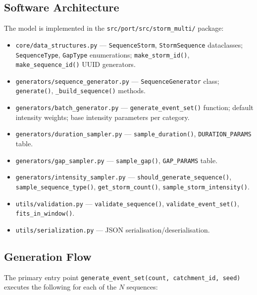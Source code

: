 \documentclass[11pt,a4paper]{article}
\begin{document}
\mkmimplementation

\subsection{Software Architecture}

The model is implemented in the \texttt{src/port/src/storm\_multi/} package:

\begin{itemize}[nosep]
  \item \texttt{core/data\_structures.py} --- \texttt{SequenceStorm},
        \texttt{StormSequence} dataclasses; \texttt{SequenceType},
        \texttt{GapType} enumerations; \texttt{make\_storm\_id()},
        \texttt{make\_sequence\_id()} UUID generators.
  \item \texttt{generators/sequence\_generator.py} --- \texttt{SequenceGenerator}
        class; \texttt{generate()}, \texttt{\_build\_sequence()} methods.
  \item \texttt{generators/batch\_generator.py} --- \texttt{generate\_event\_set()}
        function; default intensity weights; base intensity parameters per category.
  \item \texttt{generators/duration\_sampler.py} --- \texttt{sample\_duration()},
        \texttt{DURATION\_PARAMS} table.
  \item \texttt{generators/gap\_sampler.py} --- \texttt{sample\_gap()},
        \texttt{GAP\_PARAMS} table.
  \item \texttt{generators/intensity\_sampler.py} --- \texttt{should\_generate\_sequence()},
        \texttt{sample\_sequence\_type()}, \texttt{get\_storm\_count()},
        \texttt{sample\_storm\_intensity()}.
  \item \texttt{utils/validation.py} --- \texttt{validate\_sequence()},
        \texttt{validate\_event\_set()}, \texttt{fits\_in\_window()}.
  \item \texttt{utils/serialization.py} --- JSON serialisation/deserialisation.
\end{itemize}

\subsection{Generation Flow}

The primary entry point \texttt{generate\_event\_set(count, catchment\_id, seed)}
executes the following for each of the $N$ sequences:
\end{document}
